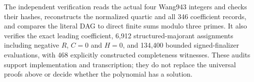 The independent verification reads the actual four Wang943 integers and
checks their hashes, reconstructs the normalized quartic and all 346
coefficient records, and compares the literal DAG to direct finite sums
modulo three primes. It also verifies the exact leading coefficient,
6,912 structured-majorant assignments including negative $R$, $C=0$ and
$H=0$, and 134,400 bounded signed-finalizer evaluations, with 468 explicitly
constructed completeness witnesses. These audits support implementation
and transcription; they do not replace the universal proofs above or
decide whether the polynomial has a solution.

